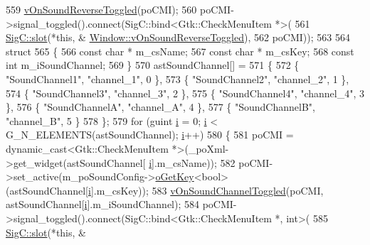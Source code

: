\begin{DoxyCode}
{{559   \mbox{\hyperlink{class_v_b_a_1_1_window_a1b7f801dd8f6c48c9161314e4ed266ed}{vOnSoundReverseToggled}}(poCMI);
560   poCMI->signal\_toggled().connect(SigC::bind<Gtk::CheckMenuItem *>(
561                                     \mbox{\hyperlink{namespace_sig_c_a92e4f19202b77e78ac1db05f5a62f6b6}{SigC::slot}}(*\textcolor{keyword}{this}, &
      \mbox{\hyperlink{class_v_b_a_1_1_window_a1b7f801dd8f6c48c9161314e4ed266ed}{Window::vOnSoundReverseToggled}}),
562                                     poCMI));
563 
564   \textcolor{keyword}{struct}
565   \{
566     \textcolor{keyword}{const} \textcolor{keywordtype}{char} * m\_csName;
567     \textcolor{keyword}{const} \textcolor{keywordtype}{char} * m\_csKey;
568     \textcolor{keyword}{const} \textcolor{keywordtype}{int}    m\_iSoundChannel;
569   \}
570   astSoundChannel[] =
571   \{
572     \{ \textcolor{stringliteral}{"SoundChannel1"}, \textcolor{stringliteral}{"channel\_1"}, 0 \},
573     \{ \textcolor{stringliteral}{"SoundChannel2"}, \textcolor{stringliteral}{"channel\_2"}, 1 \},
574     \{ \textcolor{stringliteral}{"SoundChannel3"}, \textcolor{stringliteral}{"channel\_3"}, 2 \},
575     \{ \textcolor{stringliteral}{"SoundChannel4"}, \textcolor{stringliteral}{"channel\_4"}, 3 \},
576     \{ \textcolor{stringliteral}{"SoundChannelA"}, \textcolor{stringliteral}{"channel\_A"}, 4 \},
577     \{ \textcolor{stringliteral}{"SoundChannelB"}, \textcolor{stringliteral}{"channel\_B"}, 5 \}
578   \};
579   \textcolor{keywordflow}{for} (guint \mbox{\hyperlink{expr-lex_8cpp_acb559820d9ca11295b4500f179ef6392}{i}} = 0; \mbox{\hyperlink{expr-lex_8cpp_acb559820d9ca11295b4500f179ef6392}{i}} < G\_N\_ELEMENTS(astSoundChannel); \mbox{\hyperlink{expr-lex_8cpp_acb559820d9ca11295b4500f179ef6392}{i}}++)
580   \{
581     poCMI = \textcolor{keyword}{dynamic\_cast<}Gtk::CheckMenuItem *\textcolor{keyword}{>}(\_poXml->get\_widget(astSoundChannel[
      \mbox{\hyperlink{expr-lex_8cpp_acb559820d9ca11295b4500f179ef6392}{i}}].m\_csName));
582     poCMI->set\_active(m\_poSoundConfig->\mbox{\hyperlink{class_v_b_a_1_1_config_1_1_section_ab169d7aae4e9dde91418ba1668e3ad39}{oGetKey}}<\textcolor{keywordtype}{bool}>(astSoundChannel[\mbox{\hyperlink{expr-lex_8cpp_acb559820d9ca11295b4500f179ef6392}{i}}].m\_csKey));
583     \mbox{\hyperlink{class_v_b_a_1_1_window_aa64899ec70d7a82ab4eee24567585f3b}{vOnSoundChannelToggled}}(poCMI, astSoundChannel[\mbox{\hyperlink{expr-lex_8cpp_acb559820d9ca11295b4500f179ef6392}{i}}].m\_iSoundChannel);
584     poCMI->signal\_toggled().connect(SigC::bind<Gtk::CheckMenuItem *, int>(
585                                       \mbox{\hyperlink{namespace_sig_c_a92e4f19202b77e78ac1db05f5a62f6b6}{SigC::slot}}(*\textcolor{keyword}{this}, &
}}
\end{DoxyCode}
